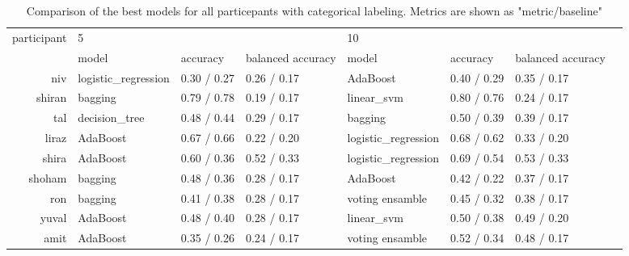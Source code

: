 \documentclass[../main.tex]{subfiles}
\begin{document}
\begin{table}[!h]
    \begin{tabular}{rlllllll}
        \toprule
        participant &  \multicolumn{3}{l}{5} & \multicolumn{3}{l}{10} \\
              &                 model &     accuracy & balanced accuracy &                model &     accuracy & balanced accuracy \\
        \midrule
             niv &  logistic\_regression &  0.30 / 0.27 &       0.26 / 0.17 &             AdaBoost &  0.40 / 0.29 &       0.35 / 0.17 \\
          shiran &              bagging &  0.79 / 0.78 &       0.19 / 0.17 &           linear\_svm &  0.80 / 0.76 &       0.24 / 0.17 \\
             tal &        decision\_tree &  0.48 / 0.44 &       0.29 / 0.17 &              bagging &  0.50 / 0.39 &       0.39 / 0.17 \\
           liraz &             AdaBoost &  0.67 / 0.66 &       0.22 / 0.20 &  logistic\_regression &  0.68 / 0.62 &       0.33 / 0.20 \\
           shira &             AdaBoost &  0.60 / 0.36 &       0.52 / 0.33 &  logistic\_regression &  0.69 / 0.54 &       0.53 / 0.33 \\
          shoham &              bagging &  0.48 / 0.36 &       0.28 / 0.17 &             AdaBoost &  0.42 / 0.22 &       0.37 / 0.17 \\
             ron &              bagging &  0.41 / 0.38 &       0.28 / 0.17 &      voting ensamble &  0.45 / 0.32 &       0.38 / 0.17 \\
           yuval &             AdaBoost &  0.48 / 0.40 &       0.28 / 0.17 &           linear\_svm &  0.50 / 0.38 &       0.49 / 0.20 \\
            amit &             AdaBoost &  0.35 / 0.26 &       0.24 / 0.17 &      voting ensamble &  0.52 / 0.34 &       0.48 / 0.17 \\
        \bottomrule
    \end{tabular}
    \caption{Comparison of the best models for all particepants with categorical labeling. Metrics are shown as "metric/baseline"}
\end{table}
\end{document}
